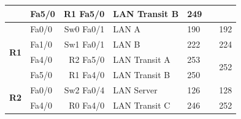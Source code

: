 \documentclass[11pt,a4paper]{report}
\begin{document}
\begin{longtable}[c]{llrllrr}
                                                               & Fa5/0                        & R1 Fa5/0                  & LAN Transit B                                         & 249                                              &                                                       &                                                           \\ \hline
            \multirow{4}{*}{\textbf{R1}}                       & Fa0/0                        & Sw0 Fa0/1                 & LAN A                                                 & 190                                              &                                                       & 192                                                       \\
                                                               & Fa1/0                        & Sw1 Fa0/1                 & LAN B                                                 & 222                                              &                                                       & 224                                                       \\ \cline{5-7}
                                                               & Fa4/0                        & R2 Fa5/0                  & LAN Transit A                                         & 253                                              &                                                       & \multirow{2}{*}{252}                                      \\
                                                               & Fa5/0                        & R1 Fa4/0                  & LAN Transit B                                         & 250                                              &                                                       &                                                           \\ \hline
            \multirow{3}{*}{\textbf{R2}}                       & Fa0/0                        & Sw2 Fa0/4                 & LAN Server                                            & 126                                              &                                                       & 128                                                       \\ \cline{5-7}
                                                               & Fa4/0                        & R0 Fa4/0                  & LAN Transit C                                         & 246                                              &                                                       & \multirow{2}{*}{252}                                      \\

\end{longtable}
\end{document}
